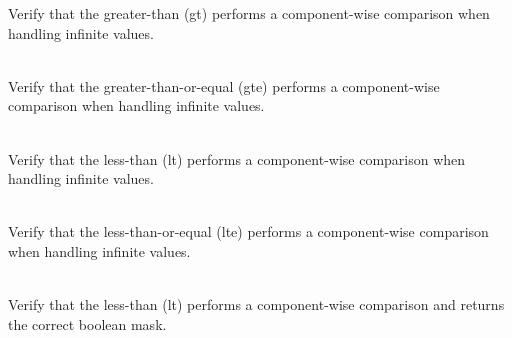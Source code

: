 \begin{DoxyRefList}
\label{test__test000046}%
%
Verify that the  greater-\/than (gt) performs a component-\/wise comparison when handling infinite values.  
\item[{\parbox[t]{\linewidth}{Member \doxylink{group___f_g_m___vec4___g_t_e___comp_ga8e19507625dae566ec1399d7ecdbd9c9}{Vector4\+DComparison\+\_\+\+Infinity\+Vector\+\_\+\+Greater\+Than\+Or\+Equal\+\_\+\+Returns\+Boolean\+Vector\+With\+Correct\+Values} ()}}]\hfill \\
\label{test__test000052}%
%
Verify that the  greater-\/than-\/or-\/equal (gte) performs a component-\/wise comparison when handling infinite values.  
\item[{\parbox[t]{\linewidth}{Member \doxylink{group___f_g_m___vec4___l_t___comp_ga1e5d486f6ee6246651733a3eb0dd5a77}{Vector4\+DComparison\+\_\+\+Infinity\+Vector\+\_\+\+Less\+Than\+\_\+\+Returns\+Boolean\+Vector\+With\+Correct\+Values} ()}}]\hfill \\
\label{test__test000058}%
%
Verify that the  less-\/than (lt) performs a component-\/wise comparison when handling infinite values.  
\item[{\parbox[t]{\linewidth}{Member \doxylink{group___f_g_m___vec4___l_t_e___comp_gaf5e6c50f572c1a1e7450b60046bfe7a4}{Vector4\+DComparison\+\_\+\+Infinity\+Vector\+\_\+\+Less\+Than\+Or\+Equal\+\_\+\+Returns\+Boolean\+Vector\+With\+Correct\+Values} ()}}]\hfill \\
\label{test__test000064}%
%
Verify that the  less-\/than-\/or-\/equal (lte) performs a component-\/wise comparison when handling infinite values.  
\item[{\parbox[t]{\linewidth}{Member \doxylink{group___f_g_m___vec4___l_t___comp_ga771a3b2d2bbf2b7ceb8af9609b07bc31}{Vector4\+DComparison\+\_\+\+Less\+Than\+\_\+\+Returns\+Boolean\+Vector\+With\+Elements\+Less\+Than\+As\+True} ()}}]\hfill \\
\label{test__test000055}%
%
Verify that the  less-\/than (lt) performs a component-\/wise comparison and returns the correct boolean mask.  
\item[{\parbox[t]{\linewidth}{Member \doxylink{group___f_g_m___vec4___l_t___comp_ga2fc22660d0473420c9f0f771681ec232}{Vector4\+DComparison\+\_\+\+Less\+Than\+Operator\+\_\+\+Returns\+Boolean\+Vector\+With\+Elements\+Less\+Than\+As\+True} ()}}]\hfill \\

\end{DoxyRefList}
